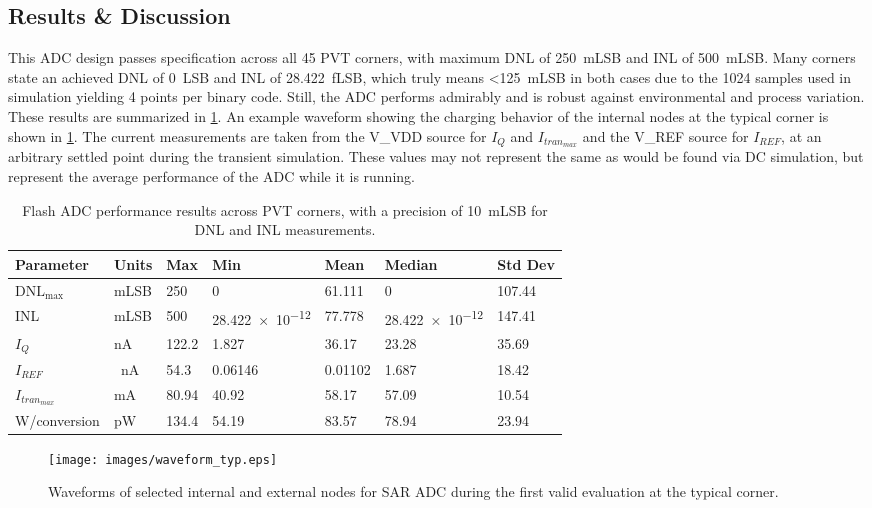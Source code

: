 \documentclass[11pt,letterpaper]{article}
\begin{document}
\subsection {Results \& Discussion}

This ADC design passes specification across all 45 PVT corners, with maximum DNL of \qty{250}{mLSB} and INL of \qty{500}{mLSB}. Many corners state an achieved DNL of \qty{0}{LSB} and INL of \qty{28.422}{fLSB}, which truly means <\qty{125}{mLSB} in both cases due to the 1024 samples used in simulation yielding 4 points per binary code. Still, the ADC performs admirably and is robust against environmental and process variation. These results are summarized in \cref{tab:pvt_results}. An example waveform showing the charging behavior of the internal nodes at the typical corner is shown in \cref{fig:typ_wave}. The current measurements are taken from the V\_VDD source for \(I_Q\) and \(I_{tran_{max}}\) and the V\_REF source for \(I_{REF}\), at an arbitrary settled point during the transient simulation. These values may not represent the same as would be found via DC simulation, but represent the average performance of the ADC while it is running.

\begin{table}[htbp!]
    \centering
    \begin{tabular}{lllllll}
    \toprule
        \textbf{Parameter} & \textbf{Units} & \textbf{Max} & \textbf{Min} & \textbf{Mean} & \textbf{Median} & \textbf{Std Dev}\\
    \midrule
        \(\mathrm{DNL_{max}}\) & mLSB & 250 & 0 & 61.111 & 0 & 107.44 \\
        INL & mLSB & 500 & \qty{28.422e-12}{} & 77.778 & \qty{28.422e-12}{} & 147.41 \\
        \(I_Q\) & nA & 122.2 & 1.827 & 36.17 & 23.28 & 35.69 \\
        \(I_{REF}\) & \qty{}{\nA} & 54.3 & 0.06146 & 0.01102 & 1.687 & 18.42\\
        \(I_{tran_{max}}\) & mA & 80.94 & 40.92 & 58.17 & 57.09 & 10.54\\
        W/conversion & pW & 134.4 & 54.19 & 83.57 & 78.94 &  23.94\\
    \bottomrule
    \end{tabular}
    \caption{Flash ADC performance results across PVT corners, with a precision of \qty{10}{mLSB} for DNL and INL measurements.}\label{tab:pvt_results}
\end{table}

\begin{figure}[htbp!]
		\centering
	    \texttt{[image: images/waveform\_typ.eps]}
		\caption{Waveforms of selected internal and external nodes for SAR ADC during the first valid evaluation at the typical corner.}\label{fig:typ_wave}
\end{figure}
\end{document}
